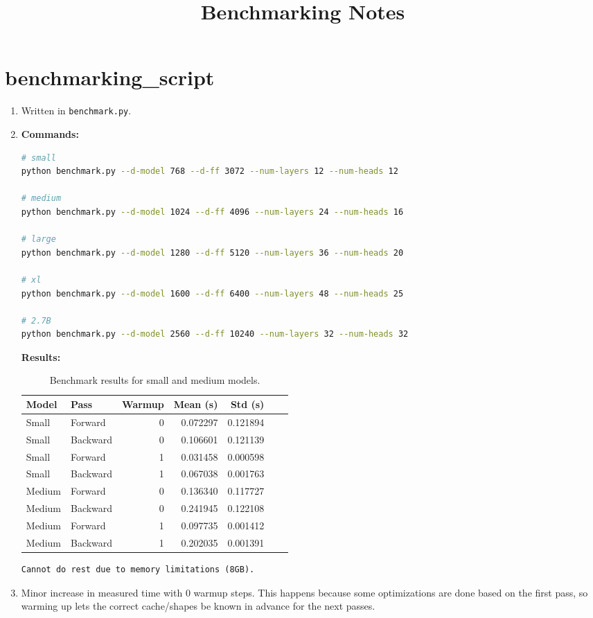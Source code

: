 \documentclass{article}
\title{Benchmarking Notes}
\author{}
\date{}
\begin{document}
\maketitle

\section{benchmarking\_script}

\begin{enumerate}
\item
Written in \texttt{benchmark.py}.

\item
\textbf{Commands:}
\begin{lstlisting}[language=bash]
# small
python benchmark.py --d-model 768 --d-ff 3072 --num-layers 12 --num-heads 12

# medium
python benchmark.py --d-model 1024 --d-ff 4096 --num-layers 24 --num-heads 16

# large
python benchmark.py --d-model 1280 --d-ff 5120 --num-layers 36 --num-heads 20

# xl
python benchmark.py --d-model 1600 --d-ff 6400 --num-layers 48 --num-heads 25

# 2.7B
python benchmark.py --d-model 2560 --d-ff 10240 --num-layers 32 --num-heads 32
\end{lstlisting}


\noindent\textbf{Results:}
\begin{table}[h!]
\centering
\caption{Benchmark results for small and medium models.}
\label{tab:benchmark}
\begin{tabular}{llrrrrr}
\toprule
Model & Pass & Warmup & Mean (s) & Std (s) \\
\midrule
Small  & Forward  & 0 & 0.072297 & 0.121894 \\
Small  & Backward & 0 & 0.106601 & 0.121139 \\
Small  & Forward  & 1 & 0.031458 & 0.000598 \\
Small  & Backward & 1 & 0.067038 & 0.001763 \\
Medium & Forward  & 0 & 0.136340 & 0.117727 \\
Medium & Backward & 0 & 0.241945 & 0.122108 \\
Medium & Forward  & 1 & 0.097735 & 0.001412 \\
Medium & Backward & 1 & 0.202035 & 0.001391 \\
\bottomrule
\end{tabular}
\end{table}

\begin{lstlisting}
Cannot do rest due to memory limitations (8GB).
\end{lstlisting}

\item
Minor increase in measured time with 0 warmup steps. This happens because some optimizations are done based on the first pass, so warming up lets the correct cache/shapes be known in advance for the next passes.
\end{enumerate}
\end{document}
